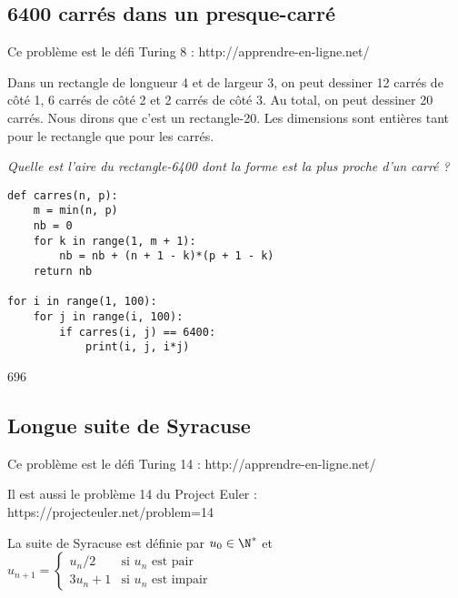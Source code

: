 \subsection{6400 carrés dans un presque-carré}
{\sf Ce problème est le défi Turing 8 : http://apprendre-en-ligne.net/}

Dans un rectangle de longueur 4 et de largeur 3, on peut dessiner 12 carrés de côté 1, 6 carrés de côté 2 et 2 carrés de côté 3. Au total, on peut dessiner 20 carrés. Nous dirons que c'est un rectangle-20.
Les dimensions sont entières tant pour le rectangle que pour les carrés.

\begin{Exercise}
\it Quelle est l'aire du rectangle-6400 dont la forme est la plus proche d'un carré ?
\end{Exercise}
\begin{Answer}
\begin{lstlisting}
def carres(n, p):
    m = min(n, p)
    nb = 0
    for k in range(1, m + 1):
        nb = nb + (n + 1 - k)*(p + 1 - k)
    return nb

for i in range(1, 100):
    for j in range(i, 100):
        if carres(i, j) == 6400:
            print(i, j, i*j)
\end{lstlisting}
696
\end{Answer}
\subsection{Longue suite de Syracuse}
{\sf Ce problème est le défi Turing 14 : http://apprendre-en-ligne.net/

Il est aussi le problème 14 du Project Euler : https://projecteuler.net/problem=14}

La suite de Syracuse est définie par $u_0\in \N^*$ et 
$\displaystyle u_{n+1} =\left\{\begin{matrix} u_n/2&\text{si $u_n$ est pair}\\ 3u_n + 1&\text{si $u_n$ est impair} 
\end{matrix}\right.$

